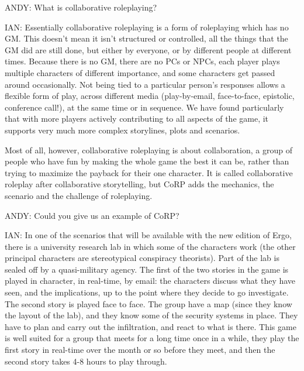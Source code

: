 \documentclass[twoside]{book}
\begin{document}
\begin{description}


\item{ANDY:} What is collaborative roleplaying?

\item{IAN:} Essentially collaborative roleplaying is a form of roleplaying which has no GM. This doesn't mean it isn't structured or controlled, all the things that the GM did are still done, but either by everyone, or by different people at different times. Because there is no GM, there are no PCs or NPCs, each player plays multiple characters of different importance, and some characters get passed around occasionally. Not being tied to a particular person's responses allows a flexible form of play, across different media (play-by-email, face-to-face, epistolic, conference call!), at the same time or in sequence. We have found particularly that with more players actively contributing to all aspects of the game, it supports very much more complex storylines, plots and scenarios.

Most of all, however, collaborative roleplaying is about collaboration, a group of people who have fun by making the whole game the best it can be, rather than trying to maximize the payback for their one character. It is called collaborative roleplay after collaborative storytelling, but CoRP adds the mechanics, the scenario and the challenge of roleplaying.

\item{ANDY:} Could you give us an example of CoRP?

\item{IAN:} In one of the scenarios that will be available with the new edition of Ergo, there is a university research lab in which some of the characters work (the other principal characters are stereotypical conspiracy theorists). Part of the lab is sealed off by a quasi-military agency. The first of the two stories in the game is played in character, in real-time, by email: the characters discuss what they have seen, and the implications, up to the point where they decide to go investigate. The second story is played face to face. The group have a map (since they know the layout of the lab), and they know some of the security systems in place. They have to plan and carry out the infiltration, and react to what is there. This game is well suited for a group that meets for a long time once in a while, they play the first story in real-time over the month or so before they meet, and then the second story takes 4-8 hours to play through.


\end{description}
\end{document}
